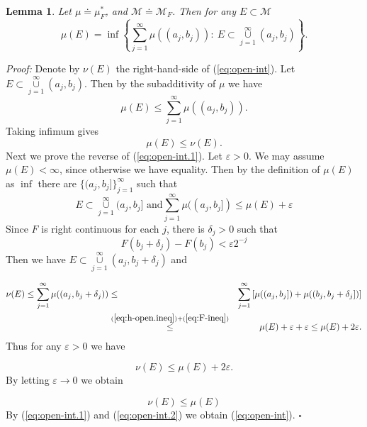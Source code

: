 \documentclass[12pt]{report}
\newtheorem{lemma}[theorem]{Lemma}
\begin{document}
\begin{lemma} Let $\mu \doteq \mu^\ast_F$, and $\mathcal{M}
\doteq
\mathcal{M}_F$.  Then for any $E \subset \mathcal{M}$
\begin{equation}\label{eq:open-int}
\mu(E) = \inf \left \{ \sum^\infty_{j=1} \mu((a_j, b_j)): \ E \subset
\overset{\infty}{\underset{j=1}{\cup}}  (a_j, b_j) \right \}.
\end{equation}
\end{lemma}
\textit{Proof:}  Denote by $\nu (E)$ the right-hand-side of 
(\ref{eq:open-int}).  
Let $E\subset
\overset{\infty}{\underset{j=1}{\cup}}  (a_j, b_j)$.  Then
by the subadditivity of $\mu$ we have
\[
\mu(E)\le\sum^\infty_{j=1} \mu((a_j, b_j)) .
\] 
Taking infimum gives
\begin{equation}\label{eq:open-int.1}
\mu(E)\le \nu (E) .
\end{equation}
Next we prove the reverse of (\ref{eq:open-int.1}).  Let $\varepsilon >
0$.   We may assume
$\mu(E)<\infty$, since otherwise we have equality. Then by the definition of
$\mu(E)$ as $\inf$ there are $\{(a_j, b_j] \}^\infty_{j=1}$ such that
\begin{equation}\label{eq:h-open.ineq}
 E \subset \overset{\infty}{\underset{j=1}{\cup}}  (a_j, b_j] \mbox{ and
}\sum^\infty_{j=1}
\mu((a_j, b_j]) \le \mu(E) + \varepsilon
\end{equation} 
Since $F$ is right continuous for each $j$, there is
$\delta_j > 0$ such that
\begin{equation}\label{eq:F-ineq}
 F(b_j + \delta_j) - F(b_j) < \varepsilon 2^{-j}
\end{equation} 
Then we have $E \subset
\overset{\infty}{\underset{j=1}{\cup}}  (a_j, b_j +
\delta_j)$ and

\begin{eqnarray*} \nu(E) \le \sum^\infty_{j=1} \mu ((a_j, b_j + \delta_j))
&\le & \sum^\infty_{j=1} \left [ \mu((a_j, b_j]) +
\mu((b_j, b_j + \delta_j] )\right ]\\ &\overset{(\ref{eq:h-open.ineq}) +
(\ref{eq:F-ineq})}{\le}&
\mu(E) +
\varepsilon  + \varepsilon \le \mu(E) + 2
\varepsilon.
\end{eqnarray*} Thus for any $\varepsilon > 0 $ we have

\[\nu(E) \le \mu(E) + 2 \varepsilon.
\] By letting $\varepsilon \to 0$ we obtain

\begin{equation}\label{eq:open-int.2}
\nu(E) \le \mu(E)
\end{equation} 
By (\ref{eq:open-int.1}) and (\ref{eq:open-int.2}) we
obtain (\ref{eq:open-int}). $\square$
\end{document}
